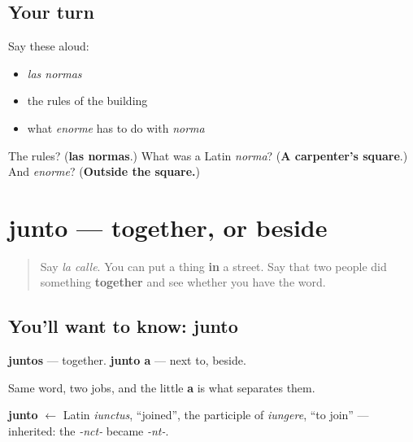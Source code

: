 \subsection*{Your turn}
Say these aloud:

\begin{itemize}
\raggedright
  \item \emph{las normas}
  \item the rules of the building
  \item what \emph{enorme} has to do with \emph{norma}
\end{itemize}

\begin{tcolorbox}[breakable,colback=teal!4,colframe=teal!35!black,title={Before you move on}]
The rules? (\textbf{las normas}.) What was a Latin \emph{norma}? (\textbf{A carpenter's square}.) And \emph{enorme}? (\textbf{Outside the square.})
\end{tcolorbox}
\section[junto]{junto — together, or beside}

\label{lesson:ES-C433-junto}



\begin{quote}
Say \emph{la calle}. You can put a thing \textbf{in} a street. Say that two people did something \textbf{together} and see whether you have the word.
\end{quote}

\subsection*{You'll want to know: junto}
\textbf{juntos} — together. \textbf{junto a} — next to, beside.

Same word, two jobs, and the little \textbf{a} is what separates them.

\begin{cousinweb}
\textbf{junto} $\leftarrow$ Latin \emph{iunctus}, \textquotedblleft{}joined\textquotedblright{}, the participle of \emph{iungere}, \textquotedblleft{}to join\textquotedblright{} — inherited: the \emph{-nct-} became \emph{-nt-}.
\end{cousinweb}

